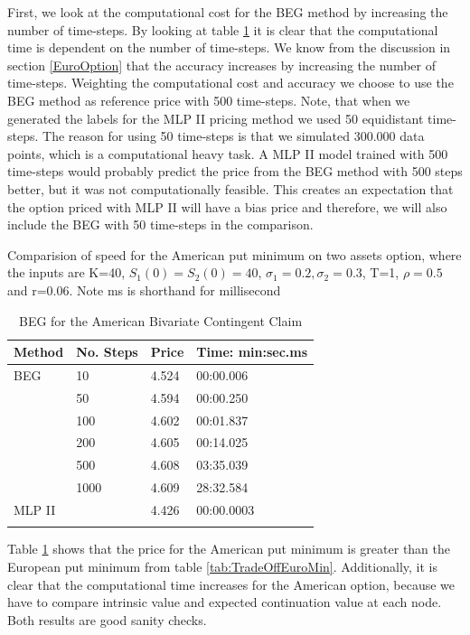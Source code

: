First, we look at the computational cost for the BEG method by increasing the number of time-steps. By looking at table \ref{tab:TradeOffAmerMin} it is clear that the computational time is dependent on the number of time-steps. We know from the discussion in section \ref{EuroOption} that the accuracy increases by increasing the number of time-steps. Weighting the computational cost and accuracy we choose to use the BEG method as reference price with 500 time-steps. Note, that when we generated the labels for the MLP II pricing method we used 50 equidistant time-steps. The reason for using 50 time-steps is that we simulated 300.000 data points, which is a computational heavy task. A MLP II model trained with 500 time-steps would probably predict the price from the BEG method with 500 steps better, but it was not computationally feasible. This creates an expectation that the option priced with MLP II will have a bias price and therefore, we will also include the BEG with 50 time-steps in the comparison.\\

\begin{table}[th]
\caption{BEG for the American Bivariate Contingent Claim}{Comparision of speed for the American put minimum on two assets option, where the inputs are K=40, $S_1(0)=S_2(0)=40$, $\sigma_1=0.2, \sigma_2=0.3$, T=1, $\rho=0.5$  and r=0.06. Note ms is shorthand for millisecond}
\label{tab:TradeOffAmerMin}
\centering
\begin{tabular}{l l l l}
\toprule
\textbf{Method} & \textbf{No. Steps} & \textbf{Price} & \textbf{Time: min:sec.ms} \\
\midrule
BEG & 10 & 4.524 & 00:00.006\\
& 50 & 4.594 & 00:00.250\\
& 100 & 4.602 & 00:01.837\\
& 200 & 4.605 & 00:14.025\\
& 500 & 4.608 & 03:35.039\\
& 1000 & 4.609 & 28:32.584\\
MLP II &  & 4.426 & 00:00.0003\\
\bottomrule\\
\end{tabular}
\end{table}

Table \ref{tab:TradeOffAmerMin} shows that the price for the American put minimum is greater than the European put minimum from table \ref{tab:TradeOffEuroMin}. Additionally, it is clear that the computational time increases for the American option, because we have to compare intrinsic value and expected continuation value at each node. Both results are good sanity checks.\\

